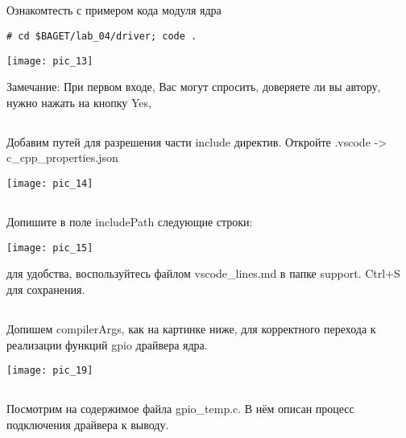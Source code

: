 \subsection{}Ознакомтесть с примером кода модуля ядра 
\begin{lstlisting}[style=bash]
# cd $BAGET/lab_04/driver; code .
\end{lstlisting}
\begin{center}
	\texttt{[image: pic\_13]}
\end{center}
\begin{Notes}{Замечание:}
	При первом входе, Вас могут спросить, доверяете ли вы автору, нужно нажать на кнопку Yes,
\end{Notes}

\subsection{}Добавим путей для разрешения части include директив. Откройте .vscode -> c\_cpp\_properties.json
\begin{center}
	\texttt{[image: pic\_14]}
\end{center}

\subsection{}Допишите в поле includePath следующие строки:\\
\begin{center}
	\texttt{[image: pic\_15]}
\end{center}
для удобства, воспользуйтесь файлом vscode\_lines.md в папке support. Ctrl+S для сохранения.

\subsection{}Допишем compilerArgs, как на картинке ниже, для корректного перехода к реализации функций gpio драйвера ядра.\\
\begin{center}
	\texttt{[image: pic\_19]}
\end{center}

\subsection{}Посмотрим на содержимое файла gpio\_temp.c. В нём описан процесс подключения драйвера к выводу.


